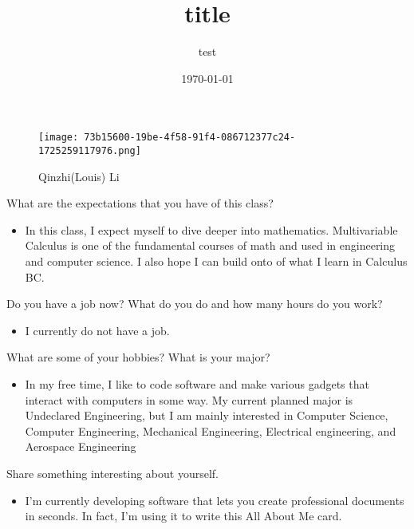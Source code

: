 \documentclass{article}
\title{title}\author{test}\date{\today}
\begin{document}
\begin{figure}[h]
\centering
\texttt{[image: 73b15600-19be-4f58-91f4-086712377c24-1725259117976.png]}
\caption{Qinzhi(Louis) Li}
\end{figure}

What are the expectations that you have of this class?

\begin{itemize}
\item 
In this class, I expect myself to dive deeper into mathematics. Multivariable Calculus is one of the fundamental courses of math and used in engineering and computer science. I also hope I can build onto of what I learn in Calculus BC.

\end{itemize}



Do you have a job now? What do you do and how many hours do you work?

\begin{itemize}
\item 
I currently do not have a job.

\end{itemize}



What are some of your hobbies? What is your major?

\begin{itemize}
\item 
In my free time, I like to code software and make various gadgets that interact with computers in some way. My current planned major is Undeclared Engineering, but I am mainly interested in Computer Science, Computer Engineering, Mechanical Engineering, Electrical engineering, and Aerospace Engineering

\end{itemize}

Share something interesting about yourself. 

\begin{itemize}
\item 
I’m currently developing software that lets you create professional documents in seconds. In fact, I’m using it to write this All About Me card.

\end{itemize}
\end{document}
